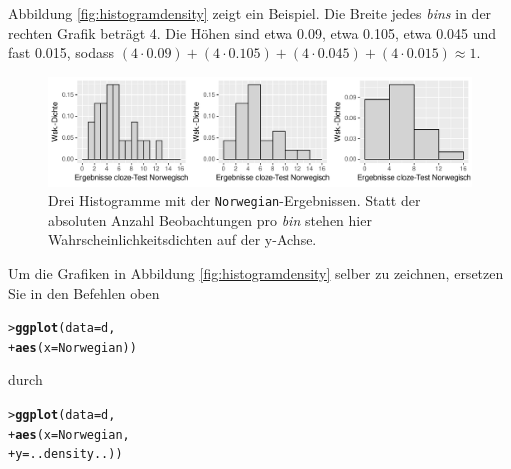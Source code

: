 \documentclass[oneside, 10pt]{book}\usepackage[]{graphicx}\usepackage[]{xcolor}
\makeatletter
\newcommand{\hlstd}[1]{\textcolor[rgb]{0.345,0.345,0.345}{#1}}%
\newcommand{\hlkwc}[1]{\textcolor[rgb]{0.333,0.667,0.333}{#1}}%
\newcommand{\hlkwd}[1]{\textcolor[rgb]{0.737,0.353,0.396}{\textbf{#1}}}%
\newenvironment{kframe}{%
 \def\at@end@of@kframe{}%
 \ifinner\ifhmode%
  \def\at@end@of@kframe{\end{minipage}}%
  \begin{minipage}{\columnwidth}%
 \fi\fi%
 \def\FrameCommand##1{\hskip\@totalleftmargin \hskip-\fboxsep
 \colorbox{shadecolor}{##1}\hskip-\fboxsep
     \hskip-\linewidth \hskip-\@totalleftmargin \hskip\columnwidth}%
 \MakeFramed {\advance\hsize-\width
   \@totalleftmargin\z@ \linewidth\hsize
   \@setminipage}}%
 {\par\unskip\endMakeFramed%
 \at@end@of@kframe}
\newenvironment{knitrout}{}{} %
\makeatother
\begin{document}
Abbildung \ref{fig:histogramdensity} zeigt ein Beispiel.
Die Breite jedes \textit{bins} in der rechten Grafik beträgt 4.
Die Höhen sind etwa 0.09, etwa 0.105, etwa 0.045 und fast 0.015, sodass
$(4 \cdot 0.09) + (4 \cdot 0.105) + (4 \cdot 0.045) + (4 \cdot 0.015) \approx 1$.
\begin{knitrout}
\color{fgcolor}\begin{figure}[tp]

{\centering \includegraphics[width=\textwidth]{figs/unnamed-chunk-85-1} 

}

\caption{Drei Histogramme mit der \texttt{Norwegian}-Ergebnissen. Statt der absoluten Anzahl Beobachtungen pro \textit{bin} stehen hier Wahrscheinlichkeitsdichten auf der y-Achse.\label{fig:histogramdensity}}\label{fig:unnamed-chunk-85}
\end{figure}

\end{knitrout}

Um die Grafiken in Abbildung \ref{fig:histogramdensity} selber zu zeichnen, ersetzen
Sie in den Befehlen oben
\begin{knitrout}
\color{fgcolor}\begin{kframe}
\begin{alltt}
\hlstd{> }\hlkwd{ggplot}\hlstd{(}\hlkwc{data} \hlstd{= d,}
\hlstd{+ }       \hlkwd{aes}\hlstd{(}\hlkwc{x} \hlstd{= Norwegian))}
\end{alltt}
\end{kframe}
\end{knitrout}
durch
\begin{knitrout}
\color{fgcolor}\begin{kframe}
\begin{alltt}
\hlstd{> }\hlkwd{ggplot}\hlstd{(}\hlkwc{data} \hlstd{= d,}
\hlstd{+ }       \hlkwd{aes}\hlstd{(}\hlkwc{x} \hlstd{= Norwegian,}
\hlstd{+ }           \hlkwc{y} \hlstd{= ..density..))}
\end{alltt}
\end{kframe}
\end{knitrout}
\end{document}
